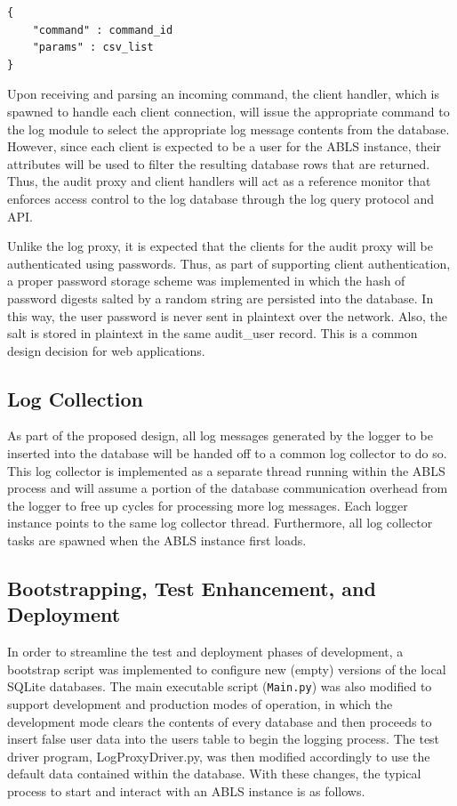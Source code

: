 \documentclass{sig-alternate}
\begin{document}
\begin{lstlisting}
{     
    "command" : command_id
    "params" : csv_list
}
\end{lstlisting}

Upon receiving and parsing an incoming command, the client handler, which is spawned to handle each client connection,
will issue the appropriate command to the log module to select the appropriate log message contents from the database. 
However, since each client is expected to be a user for the ABLS instance, their attributes will be used to filter 
the resulting database rows that are returned. Thus, the audit proxy and client handlers will act
as a reference monitor that enforces access control to the log database through the log query protocol and API.

Unlike the log proxy, it is expected that the clients for the audit proxy will be authenticated using passwords. Thus, as
part of supporting client authentication, a proper password storage scheme was implemented in which the hash of 
password digests salted by a random string are persisted into the database. In this way, the user password is never sent 
in plaintext over the network. Also, the salt is stored in plaintext in the same audit\_user record. This is a common
design decision for web applications.

\subsection{Log Collection}
As part of the proposed design, all log messages generated by the logger to be inserted into the 
database will be handed off to a common log collector to do so. This log collector is implemented as a 
separate thread running within the ABLS process and will assume a portion of the database 
communication overhead from the logger to free up cycles for processing more log messages. Each logger instance
points to the same log collector thread. Furthermore, all log collector tasks are spawned when the ABLS 
instance first loads.

\subsection{Bootstrapping, Test Enhancement, and Deployment}
In order to streamline the test and deployment phases of development, a bootstrap script was implemented to configure
new (empty) versions of the local SQLite databases. The main executable script ({\tt Main.py}) was also modified to support
development and production modes of operation, in which the development mode clears the contents of every 
database and then proceeds to insert false user data into the users table to begin the logging process. The test 
driver program, LogProxyDriver.py, was then modified accordingly to use the default data contained within the 
database. With these changes, the typical process to start and interact with an ABLS instance is as follows.
\end{document}
